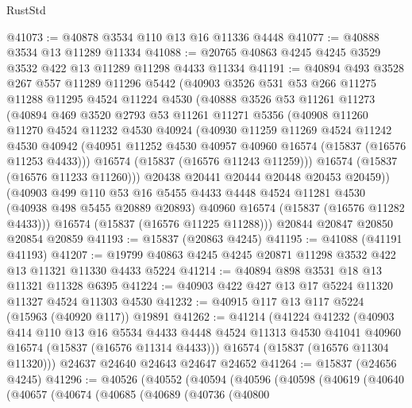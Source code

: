 \begin{lexlean}{RustStd}
\begin{coremodule}
{\begin{coremodule}
{{{{{{{{{{{{{{{{{{{{{{{{{{{{{{{{{{{{{{{{{{{{{{{{{{{{{{{{{{{{@41073 := @40878 @3534 @110 @13 @16 @11336 @4448
@41077 := @40888 @3534 @13 @11289 @11334
@41088 := @20765 @40863 @4245 @4245 @3529 @3532 @422 @13 @11289 @11298 @4433 @11334
@41191 := @40894
    @493
    @3528
    @267
    @557
    @11289
    @11296
    @5442
    (@40903
      @3526
      @531
      @53
      @266
      @11275
      @11288
      @11295
      @4524
      @11224
      @4530
      (@40888
        @3526
        @53
        @11261
        @11273
        (@40894
          @469
          @3520
          @2793
          @53
          @11261
          @11271
          @5356
          (@40908
            @11260
            @11270
            @4524
            @11232
            @4530
            @40924
            (@40930
              @11259
              @11269
              @4524
              @11242
              @4530
              @40942
              (@40951 @11252 @4530 @40957 @40960 @16574 (@15837 (@16576 @11253 @4433)))
              @16574
              (@15837 (@16576 @11243 @11259)))
            @16574
            (@15837 (@16576 @11233 @11260)))
          @20438
          @20441
          @20444
          @20448
          @20453
          @20459))
      (@40903
        @499
        @110
        @53
        @16
        @5455
        @4433
        @4448
        @4524
        @11281
        @4530
        (@40938 @498 @5455 @20889 @20893)
        @40960
        @16574
        (@15837 (@16576 @11282 @4433)))
      @16574
      (@15837 (@16576 @11225 @11288)))
    @20844
    @20847
    @20850
    @20854
    @20859
@41193 := @15837 (@20863 @4245)
@41195 := @41088 (@41191 @41193)
@41207 := @19799 @40863 @4245 @4245 @20871 @11298 @3532 @422 @13 @11321 @11330 @4433 @5224
@41214 := @40894 @898 @3531 @18 @13 @11321 @11328 @6395
@41224 := @40903 @422 @427 @13 @17 @5224 @11320 @11327 @4524 @11303 @4530
@41232 := @40915 @117 @13 @117 @5224 (@15963 (@40920 @117)) @19891
@41262 := @41214
    (@41224
      @41232
      (@40903
        @414
        @110
        @13
        @16
        @5534
        @4433
        @4448
        @4524
        @11313
        @4530
        @41041
        @40960
        @16574
        (@15837 (@16576 @11314 @4433)))
      @16574
      (@15837 (@16576 @11304 @11320)))
    @24637
    @24640
    @24643
    @24647
    @24652
@41264 := @15837 (@24656 @4245)
@41296 := @40526
    (@40552
      (@40594
        (@40596
          (@40598
            (@40619
              (@40640
                (@40657
                  (@40674
                    (@40685
                      (@40689
                        (@40736
                          (@40800
}}}}}}}}}}}}}}}}}}}}}}}}}}}}}}}}}}}}}}}}}}}}}}}}}}}}}}}}}}}}
\end{coremodule}}
\end{coremodule}
\end{lexlean}
